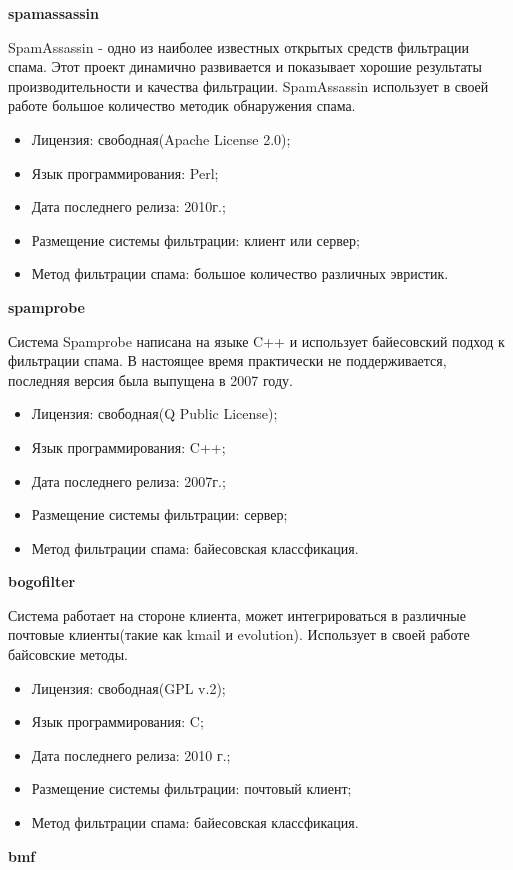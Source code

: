 \textbf{spamassassin}

SpamAssassin - одно из наиболее известных открытых средств фильтрации спама. Этот проект динамично развивается и показывает хорошие результаты производительности и качества фильтрации. SpamAssassin использует в своей работе большое количество методик обнаружения спама.

\begin{itemize}
\item Лицензия: свободная(Apache License 2.0);
\item Язык программирования: Perl;
\item Дата последнего релиза: 2010г.;
\item Размещение системы фильтрации: клиент или сервер;
\item Метод фильтрации спама: большое количество различных эвристик.
\end{itemize}

\textbf{spamprobe}

Система Spamprobe написана на языке C++ и использует байесовский подход к фильтрации спама. В настоящее время практически не поддерживается, последняя версия была выпущена в 2007 году.
\begin{itemize}
\item Лицензия: свободная(Q Public License); 
\item Язык программирования: C++;
\item Дата последнего релиза: 2007г.;
\item Размещение системы фильтрации: сервер;
\item Метод фильтрации спама: байесовская классфикация.
\end{itemize}

\textbf{bogofilter}

Система работает на стороне клиента, может интегрироваться в различные почтовые клиенты(такие как kmail и evolution). Использует в своей работе байсовские методы.
\begin{itemize}
\item Лицензия: свободная(GPL v.2); 
\item Язык программирования: C;
\item Дата последнего релиза: 2010 г.;
\item Размещение системы фильтрации: почтовый клиент;
\item Метод фильтрации спама: байесовская классфикация.
\end{itemize}

\textbf{bmf}


